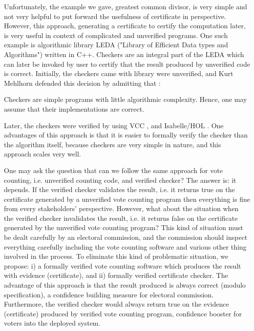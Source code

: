    
   Unfortunately, the example we gave,  greatest common divisor, is very simple and not very
   helpful to put forward the usefulness of certificate in perspective.
   However, this approach, generating a certificate to certify the computation later, is very useful in context 
   of complicated and unverified  programs.   One such example is algorithmic library  
   LEDA \citep{Mehlhorn:1995:LPC:204865.204889} ("Library of Efficient Data types and Algorithms") 
   written in C++.  Checkers are an integral part of the LEDA 
   which can later be invoked by user to certify that the result produced by unverified 
   code is correct. 
   Initially, the checkers came with library were unverified, and 
   Kurt Mehlhorn defended this decision by admitting that \citep{Alkassar2014}: 
   \begin{displayquote}
   Checkers are simple programs with little algorithmic 
   complexity. Hence, one may assume that their implementations are correct.
	\end{displayquote}   
	\noindent
    Later, the 
   checkers \citep{Alkassar2014} were verified by using VCC \citep{10.1007/978-3-642-03359-9_2}, 
   and Isabelle/HOL \citep{Nipkow:2002:IPA:1791547}.  One advantages of this approach is 
   that it is easier to formally verify the checker than the algorithm itself, because 
   checkers are very simple in nature, and this approach scales very well. 
   
   One may ask the question that can we follow the same approach for vote counting,
   i.e. unverified counting code, and verified checker?  The answer is: it depends. 
   If the verified checker validates the result, i.e. it returns true on  
   the certificate generated by a unverified 
   vote counting program then everything is fine from every stakeholders' perspective.
   However, what about the situation when the verified checker invalidates the result, i.e. 
   it returns false on the certificate generated by the unverified vote counting program? 
   This kind of situation must be dealt carefully by an electoral commission, and the commission should
   inspect everything carefully including the vote counting software and various other thing involved in the
   process.
   To eliminate this kind of problematic situation, we propose: i) a formally verified vote counting
   software which produces the result with evidence (certificate), and ii) formally verified 
   certificate checker. The advantage of this approach is that the result produced is always correct (modulo 
   specification), a confidence building measure for electoral commission. Furthermore, the verified checker would 
   always return true on the evidence (certificate) produced by verified vote counting program, confidence booster for 
   voters into the deployed system.  
  

